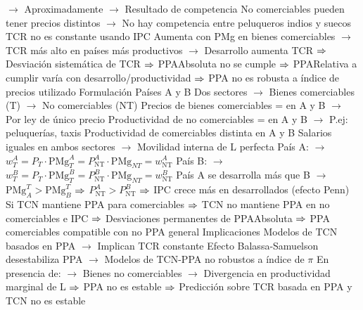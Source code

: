 \documentclass{nuevotema}
\begin{document}
\begin{esquemal}
				\4[] $\to$ Aproximadamente
				\4[] $\to$ Resultado de competencia
				\4[] No comerciables pueden tener precios distintos
				\4[] $\to$ No hay competencia entre peluqueros indios y suecos
				\4 TCR no es constante usando IPC
				\4[] Aumenta con PMg en bienes comerciables
				\4[] $\to$ TCR más alto en países más productivos
				\4[] $\to$ Desarrollo aumenta TCR
				\4[] $\Rightarrow$ Desviación sistemática de TCR
				\4[] $\Rightarrow$ PPAAbsoluta no se cumple
				\4[] $\Rightarrow$ PPARelativa a cumplir varía con desarrollo/productividad
				\4[] $\Rightarrow$ PPA no es robusta a índice de precios utilizado
				\4 Formulación
				\4[] Países A y B
				\4[] Dos sectores
				\4[] $\to$ Bienes comerciables (T)
				\4[] $\to$ No comerciables (NT)
				\4[] Precios de bienes comerciables = en A y B
				\4[] $\to$ Por ley de único precio
				\4[] Productividad de no comerciables = en A y B
				\4[] $\to$ P.ej: peluquerías, taxis
				\4[] Productividad de comerciables distinta en A y B
				\4[] Salarios iguales en ambos sectores
				\4[] $\to$ Movilidad interna de L perfecta
				\4[] País A:
				\4[] $\to$ $w_T^A = P_T \cdot \text{PMg}_T^A = P_\text{NT}^A \cdot \text{PMg}_{NT} = w_\text{NT}^A$
				\4[] País B:
				\4[] $\to$ $w_T^B = P_T \cdot \text{PMg}_T^B = P_\text{NT}^B \cdot \text{PMg}_{NT} = w_\text{NT}^B$
				\4[] País A se desarrolla más que B
				\4[] $\to$ $\text{PMg}_A^T > \text{PMg}_B^T$ $\Rightarrow$ $P_\text{NT}^A > P_\text{NT}^B$
				\4[] $\Rightarrow$ IPC crece más en desarrollados (efecto Penn)
				\4[] Si TCN mantiene PPA para comerciables
				\4[] $\Rightarrow$ TCN no mantiene PPA en no comerciables e IPC
				\4[] $\Rightarrow$ Desviaciones permanentes de PPAAbsoluta
				\4[] $\Rightarrow$ PPA comerciables compatible con no PPA general
				\4 Implicaciones
				\4[] Modelos de TCN basados en PPA
				\4[] $\to$ Implican TCR constante
				\4[] Efecto Balassa-Samuelson desestabiliza PPA
				\4[] $\to$ Modelos de TCN-PPA no robustos a índice de $\pi$
				\4[] En presencia de:
				\4[] $\to$ Bienes no comerciables
				\4[] $\to$ Divergencia en productividad marginal de L
				\4[] $\Rightarrow$ PPA no es estable
				\4[] $\Rightarrow$ Predicción sobre TCR basada en PPA y TCN no es estable


\end{esquemal}
\end{document}
